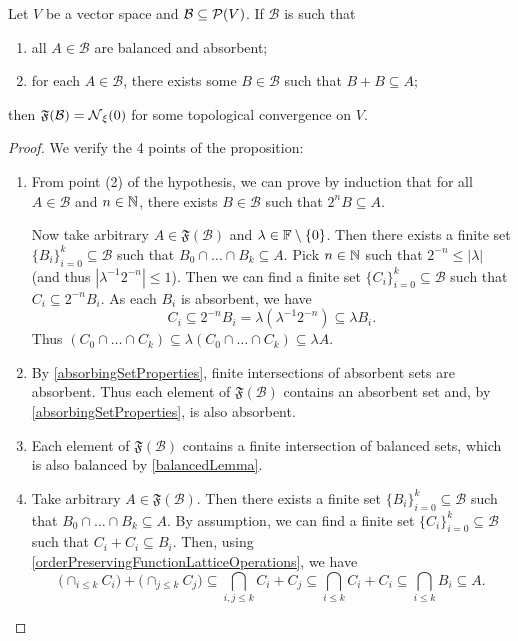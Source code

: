 \begin{corollary} \label{TVSbase}
Let $V$ be a vector space and $\mathcal{B}\subseteq\operatorname{\mathcal{P}}(V)$. If $\mathcal{B}$ is such that
\begin{enumerate}
\item all $A\in \mathcal{B}$ are balanced and absorbent;
\item for each $A\in\mathcal{B}$, there exists some $B\in \mathcal{B}$ such that $B+B\subseteq A$;
\end{enumerate}
then $\mathfrak{F}(\mathcal{B}) = \operatorname{\mathcal{N}}_\xi(0)$ for some topological convergence on $V$.
\end{corollary}
\begin{proof}
We verify the 4 points of the proposition:
\begin{enumerate}
\item From point (2) of the hypothesis, we can prove by induction that for all $A\in\mathcal{B}$ and $n\in \mathbb{N}$, there exists $B\in \mathcal{B}$ such that $2^nB \subseteq A$.

Now take arbitrary $A\in\mathfrak{F}(\mathcal{B})$ and $\lambda\in\mathbb{F}\setminus\{0\}$. Then there exists a finite set $\{B_i\}_{i=0}^k\subseteq \mathcal{B}$ such that $B_0\cap \ldots \cap B_k \subseteq A$. Pick $n\in\mathbb{N}$ such that $2^{-n}\leq |\lambda|$ (and thus $|\lambda^{-1}2^{-n}| \leq 1$). Then we can find a finite set $\{C_i\}_{i=0}^k\subseteq \mathcal{B}$ such that $C_i \subseteq 2^{-n}B_i$. As each $B_i$ is absorbent, we have
\[ C_i \subseteq 2^{-n}B_i = \lambda (\lambda^{-1}2^{-n}) \subseteq \lambda B_i. \]
Thus $(C_0\cap \ldots \cap C_k) \subseteq \lambda (C_0\cap \ldots \cap C_k) \subseteq \lambda A$.
\item By \ref{absorbingSetProperties}, finite intersections of absorbent sets are absorbent. Thus each element of $\mathfrak{F}(\mathcal{B})$ contains an absorbent set and, by \ref{absorbingSetProperties}, is also absorbent.
\item Each element of $\mathfrak{F}(\mathcal{B})$ contains a finite intersection of balanced sets, which is also balanced by \ref{balancedLemma}.
\item Take arbitrary $A\in\mathfrak{F}(\mathcal{B})$. Then there exists a finite set $\{B_i\}_{i=0}^k\subseteq \mathcal{B}$ such that $B_0\cap \ldots \cap B_k \subseteq A$. By assumption, we can find a finite set $\{C_i\}_{i=0}^k\subseteq \mathcal{B}$ such that $C_i + C_i \subseteq B_i$. Then, using \ref{orderPreservingFunctionLatticeOperations}, we have
\[ \Big(\cap_{i\leq k}C_i\Big) + \Big(\cap_{j\leq k}C_j\Big) \subseteq \bigcap_{i,j\leq k} C_i + C_j \subseteq \bigcap_{i\leq k}C_i + C_i \subseteq \bigcap_{i\leq k} B_i \subseteq A. \]
\end{enumerate}
\end{proof}


